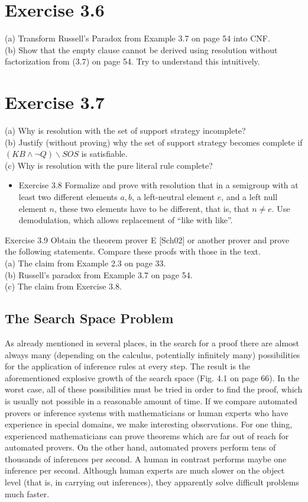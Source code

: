 \documentclass[10pt]{book}
\begin{document}
\section{Exercise 3.6}
(a) Transform Russell's Paradox from Example 3.7 on page 54 into CNF.\\
(b) Show that the empty clause cannot be derived using resolution without factorization from (3.7) on page 54. Try to understand this intuitively.

\section{Exercise 3.7}
(a) Why is resolution with the set of support strategy incomplete?\\
(b) Justify (without proving) why the set of support strategy becomes complete if $(KB \wedge \neg Q) \backslash SOS$ is satisfiable.\\
(c) Why is resolution with the pure literal rule complete?

\begin{itemize}
  \item Exercise 3.8 Formalize and prove with resolution that in a semigroup with at least two different elements $a, b$, a left-neutral element $e$, and a left null element $n$, these two elements have to be different, that is, that $n \neq e$. Use demodulation, which allows replacement of ``like with like''.
\end{itemize}

Exercise 3.9 Obtain the theorem prover E [Sch02] or another prover and prove the following statements. Compare these proofs with those in the text.\\
(a) The claim from Example 2.3 on page 33.\\
(b) Russell's paradox from Example 3.7 on page 54.\\
(c) The claim from Exercise 3.8.

\subsection{The Search Space Problem}
As already mentioned in several places, in the search for a proof there are almost always many (depending on the calculus, potentially infinitely many) possibilities for the application of inference rules at every step. The result is the aforementioned explosive growth of the search space (Fig. 4.1 on page 66). In the worst case, all of these possibilities must be tried in order to find the proof, which is usually not possible in a reasonable amount of time.
If we compare automated provers or inference systems with mathematicians or human experts who have experience in special domains, we make interesting observations. For one thing, experienced mathematicians can prove theorems which are far out of reach for automated provers. On the other hand, automated provers perform tens of thousands of inferences per second. A human in contrast performs maybe one inference per second. Although human experts are much slower on the object level (that is, in carrying out inferences), they apparently solve difficult problems much faster.
\end{document}
